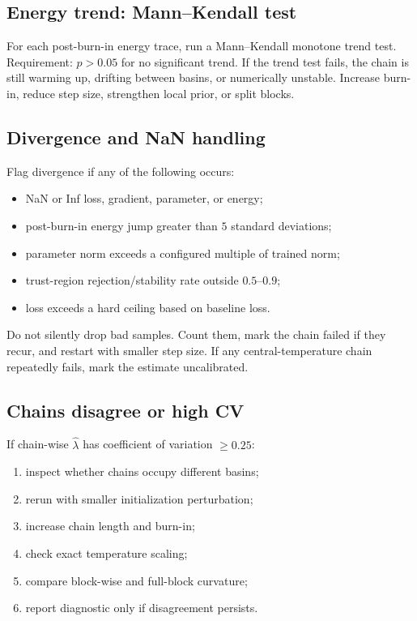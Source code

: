 \documentclass[11pt]{article}
\begin{document}
\subsection{Energy trend: Mann--Kendall test}

For each post-burn-in energy trace, run a Mann--Kendall monotone trend test.  Requirement: $p>0.05$ for no significant trend.  If the trend test fails, the chain is still warming up, drifting between basins, or numerically unstable.  Increase burn-in, reduce step size, strengthen local prior, or split blocks.

\subsection{Divergence and NaN handling}

Flag divergence if any of the following occurs:
\begin{itemize}
\item NaN or Inf loss, gradient, parameter, or energy;
\item post-burn-in energy jump greater than $5$ standard deviations;
\item parameter norm exceeds a configured multiple of trained norm;
\item trust-region rejection/stability rate outside $0.5$--$0.9$;
\item loss exceeds a hard ceiling based on baseline loss.
\end{itemize}
Do not silently drop bad samples.  Count them, mark the chain failed if they recur, and restart with smaller step size.  If any central-temperature chain repeatedly fails, mark the estimate uncalibrated.

\subsection{Chains disagree or high CV}

If chain-wise $\hat\lambda$ has coefficient of variation $\geq0.25$:
\begin{enumerate}[(1)]
\item inspect whether chains occupy different basins;
\item rerun with smaller initialization perturbation;
\item increase chain length and burn-in;
\item check exact temperature scaling;
\item compare block-wise and full-block curvature;
\item report diagnostic only if disagreement persists.
\end{enumerate}
\end{document}
